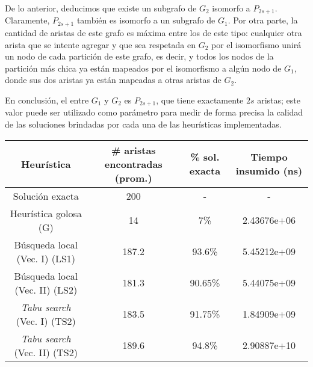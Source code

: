De lo anterior, deducimos que existe un subgrafo de $G_2$ isomorfo a
$P_{2s+1}$. Claramente, $P_{2s+1}$ también es isomorfo a un subgrafo de $G_1$.
Por otra parte, la cantidad de aristas de este grafo es máxima entre los de
este tipo: cualquier otra arista que se intente agregar y que sea respetada en
$G_2$ por el isomorfismo unirá un nodo de cada partición de este grafo, es
decir, y todos los nodos de la partición más chica ya están mapeados por el
isomorfismo a algún nodo de $G_1$, donde sus dos aristas ya están mapeadas a
otras aristas de $G_2$.

En conclusión, el  entre $G_1$ y $G_2$ es $P_{2s+1}$, que tiene
exactamente $2s$ aristas; este valor puede ser utilizado como parámetro para
medir de forma precisa la calidad de las soluciones brindadas por cada
una de las heurísticas implementadas.

\begin{center}

\begin{tabular}{c|c|c|c}
Heurística                         & \# aristas encontradas (prom.) & \% sol. exacta & Tiempo insumido (ns) \\ \hline
Solución exacta                    & 200                            & -              & -           \\
Heurística golosa (G)              & 14                             & 7\%            & 2.43676e+06 \\
Búsqueda local (Vec. I) (LS1)      & 187.2                          & 93.6\%         & 5.45212e+09 \\
Búsqueda local (Vec. II) (LS2)     & 181.3                          & 90.65\%        & 5.44075e+09 \\
\emph{Tabu search} (Vec. I) (TS2)  & 183.5                          & 91.75\%        & 1.84909e+09 \\
\emph{Tabu search} (Vec. II) (TS2) & 189.6                          & 94.8\%         & 2.90887e+10 \\
\end{tabular}

\end{center}

